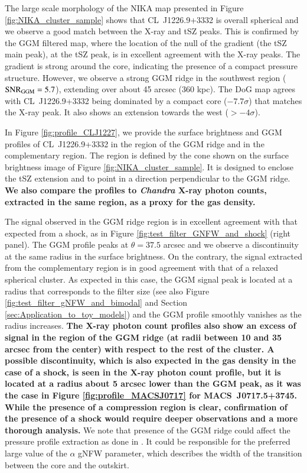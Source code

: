 \documentclass[twocolumn,traditabstract]{aa}
\begin{document}
The large scale morphology of the NIKA map presented in Figure \ref{fig:NIKA_cluster_sample} shows that \mbox{CL~J1226.9+3332} is overall spherical and we observe a good match between the X-ray and tSZ peaks. This is confirmed by the GGM filtered map, where the location of the null of the gradient (the tSZ main peak), at the tSZ peak, is in excellent agreement with the X-ray peaks. The gradient is strong around the core, indicating the presence of a compact pressure structure. However, we observe a strong GGM ridge in the southwest region (${\rm SNR}_{\rm GGM} = 5.7$), extending over about 45 arcsec (360 kpc). The DoG map agrees with \mbox{CL~J1226.9+3332} being dominated by a compact core ($-7.7 \sigma$) that matches the X-ray peak. It also shows an extension towards the west ($> -4 \sigma$).

In Figure \ref{fig:profile_CLJ1227}, we provide the surface brightness and GGM profiles of \mbox{CL~J1226.9+3332} in the region of the GGM ridge and in the complementary region. The region is defined by the cone shown on the surface brightness image of Figure \ref{fig:NIKA_cluster_sample}. It is designed to enclose the tSZ extension and to point in a direction perpendicular to the GGM ridge. {\bf We also compare the profiles to \textit{Chandra} X-ray photon counts, extracted in the same region, as a proxy for the gas density.}

The signal observed in the GGM ridge region is in excellent agreement with that expected from a shock, as in Figure \ref{fig:test_filter_GNFW_and_shock} (right panel). The GGM profile peaks at $\theta = 37.5$ arcsec and we observe a discontinuity at the same radius in the surface brightness. On the contrary, the signal extracted from the complementary region is in good agreement with that of a relaxed spherical cluster. As expected in this case, the GGM signal peak is located at a radius that corresponds to the filter size (see also Figure \ref{fig:test_filter_gNFW_and_bimodal} and Section \ref{sec:Application_to_toy_models}) and the GGM profile smoothly vanishes as the radius increases. {\bf The X-ray photon count profiles also show an excess of signal in the region of the GGM ridge (at radii between 10 and 35 arcsec from the center) with respect to the rest of the cluster. A possible discontinuity, which is also expected in the gas density in the case of a shock, is seen in the X-ray photon count profile, but it is located at a radius about 5 arcsec lower than the GGM peak, as it was the case in Figure \ref{fig:profile_MACSJ0717} for \mbox{MACS~J0717.5+3745}. While the presence of a compression region is clear, confirmation of the presence of a shock would require deeper observations and a more thorough analysis.} We note that presence of the GGM ridge could affect the pressure profile extraction as done in \cite{Romero2017}. It could be responsible for the preferred large value of the $\alpha$ gNFW parameter, which describes the width of the transition between the core and the outskirt.
\end{document}
